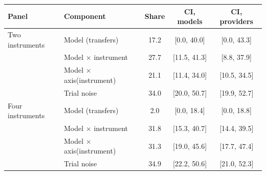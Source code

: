 \begin{tabular}{llccc}
\toprule
Panel & Component & Share & CI, models & CI, providers \\
\midrule
Two instruments & Model (transfers) & 17.2 & [0.0, 40.0] & [0.0, 43.3] \\
 & Model $\times$ instrument & 27.7 & [11.5, 41.3] & [8.8, 37.9] \\
 & Model $\times$ axis(instrument) & 21.1 & [11.4, 34.0] & [10.5, 34.5] \\
 & Trial noise & 34.0 & [20.0, 50.7] & [19.9, 52.7] \\
\addlinespace
Four instruments & Model (transfers) & 2.0 & [0.0, 18.4] & [0.0, 18.8] \\
 & Model $\times$ instrument & 31.8 & [15.3, 40.7] & [14.4, 39.5] \\
 & Model $\times$ axis(instrument) & 31.3 & [19.0, 45.6] & [17.7, 47.4] \\
 & Trial noise & 34.9 & [22.2, 50.6] & [21.0, 52.3] \\
\bottomrule
\end{tabular}
